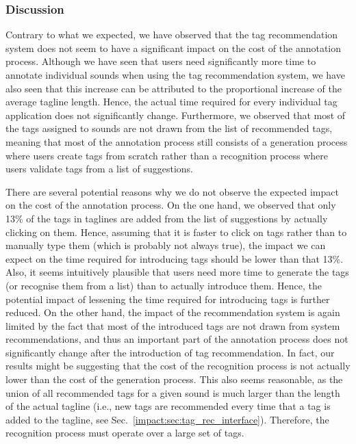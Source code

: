\subsubsection{Discussion}
\label{impact:sec:cost_annotation_process_discussion}
Contrary to what we expected, we have observed that the tag recommendation system does not seem to have a significant impact on the cost of the annotation process. 
Although we have seen that users need significantly more time to annotate individual sounds when using the tag recommendation system, we have also seen that this increase can be attributed to the proportional increase of the average tagline length. Hence, the actual time required for every individual tag application does not significantly change.
Furthermore, we observed that most of the tags assigned to sounds are not drawn from the list of recommended tags, meaning that most of the annotation process still consists of a generation process where users create tags from scratch rather than a recognition process where users validate tags from a list of suggestions.
 
There are several potential reasons why we do not observe the expected impact on the cost of the annotation process.
On the one hand, we observed that only 13\% of the tags in taglines are added from the list of suggestions by actually clicking on them. Hence, assuming that it is faster to click on tags rather than to manually type them (which is probably not always true), the impact we can expect on the time required for introducing tags should be lower than that 13\%.
Also, it seems intuitively plausible that users need more time to generate the tags (or recognise them from a list) than to actually introduce them. Hence, the potential impact of lessening the time required for introducing tags is further reduced.
On the other hand, the impact of the recommendation system is again limited by the fact that most of the introduced tags are not drawn from system recommendations, and thus an important part of the annotation process does not significantly change after the introduction of tag recommendation. In fact, our results might be suggesting that the cost of the recognition process is not actually lower than the cost of the generation process. This also seems reasonable, as the union of all recommended tags for a given sound is much larger than the length of the actual tagline (i.e., new tags are recommended every time that a tag is added to the tagline, see Sec.~\ref{impact:sec:tag_rec_interface}). Therefore, the recognition process must operate over a large set of tags. 

